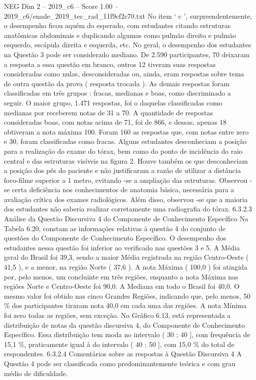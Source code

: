 \begin{textsample}{NEG Dim 2 – 2019\_c6 – Score 1.00 – 2019\_c6/enade\_2019\_tec\_rad\_11f9cf2c70.txt}
No item ‘ c ’, surpreendentemente, o desempenho ficou aquém do esperado, com estudantes citando estruturas anatômicas abdominais e duplicando algumas como pulmão direito e pulmão esquerdo, escápula direita e esquerda, etc.
No geral, o desempenho dos estudantes na Questão 3 pode ser considerado mediano.
De 2.590 participantes, 70 deixaram a resposta a essa questão em branco, outros 12 tiveram suas respostas consideradas como nulas, desconsideradas ou, ainda, eram respostas sobre tema de outra questão da prova ( resposta trocada ).
As demais respostas foram classificadas em três grupos : fracas, medianas e boas, como discriminado a seguir.
O maior grupo, 1.471 respostas, foi o daquelas classificadas como medianas por receberem notas de 31 a 70.
A quantidade de respostas consideradas boas, com notas acima de 71, foi de 866, e dessas, apenas 18 obtiveram a nota máxima 100.
Foram 160 as respostas que, com notas entre zero e 30, foram classificadas como fracas.
Alguns estudantes desconheciam a posição para a realização do exame do tórax, bem como do ponto de incidência do raio central e das estruturas visíveis na figura 2.
Houve também os que desconheciam a posição dos pés do paciente e não justificaram a razão de utilizar a distância foco-filme superior a 1 metro, evitando -se a ampliação das estruturas.
Observou -se certa deficiência nos conhecimentos de anatomia básica, necessária para a avaliação crítica dos exames radiológicos.
Além disso, observou -se que a maioria dos estudantes não saberia realizar corretamente uma radiografia do tórax. 6.3.2.3 Análise da Questão Discursiva 4 do Componente de Conhecimento Específico Na Tabela 6.20, constam as informações relativas à questão 4 do conjunto de questões do Componente de Conhecimento Específico.
O desempenho dos estudantes nessa questão foi inferior ao verificado nas questões 3 e 5.
A Média geral do Brasil foi 39,3, sendo a maior Média registrada na região Centro-Oeste ( 41,5 ), e a menor, na região Norte ( 37,6 ).
A nota Máxima ( 100,0 ) foi atingida por, pelo menos, um concluinte em três regiões, enquanto a nota Máxima nas regiões Norte e Centro-Oeste foi 90,0.
A Mediana em todo o Brasil foi 40,0.
O mesmo valor foi obtido nas cinco Grandes Regiões, indicando que, pelo menos, 50 \% dos participantes tiraram nota 40,0 em cada uma das regiões.
A nota Mínima foi zero todas as regiões, sem exceção.
No Gráfico 6.13, está representada a distribuição de notas da questão discursiva 4, do Componente de Conhecimento Específico.
Essa distribuição tem moda no intervalo ( 30 ; 40 ], com frequência de 15,1 \%, praticamente igual à do intervalo ( 40 ; 50 ], com 15,0 \% do total de respondentes. 6.3.2.4 Comentários sobre as respostas à Questão Discursiva 4 A Questão 4 pode ser classificada como predominantemente teórica e com grau médio de dificuldade.

\end{textsample}
